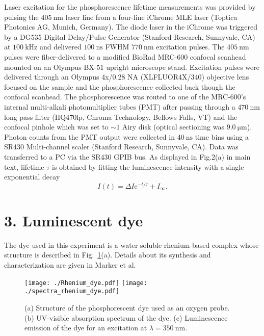 \documentclass[aps,prl,twocolumn,superscriptaddress,groupedaddress]{revtex4}
\begin{document}
Laser excitation for the phosphorescence lifetime measurements was provided by pulsing the $\SI{405}{\nano\meter}$ laser line from a four-line iChrome MLE laser (Toptica Photonics AG, Munich, Germany). The diode laser in the iChrome was triggered by a DG535 Digital Delay/Pulse Generator (Stanford Research, Sunnyvale, CA) at $\SI{100}{\kilo\hertz}$ and delivered $\SI{100}{\nano\second}$ FWHM $\SI{770}{\nano\meter}$ excitation pulses. The $\SI{405}{\nano\meter}$ pulses were fiber-delivered to a modified BioRad MRC-600 confocal scanhead mounted on an Olympus BX-51 upright microscope stand. Excitation pulses were delivered through an Olympus 4x/0.28 NA (XLFLUOR4X/340) objective lens focused on the sample and the phosphorescence collected back though the confocal scanhead. The phosphorescence was routed to one of the MRC-600's internal multi-alkali  photomultiplier tubes (PMT) after passing through a $\SI{470}{\nano\meter}$ long pass filter (HQ470lp, Chroma Technology, Bellows Falls, VT) and the confocal pinhole which was set to $\sim 1$ Airy disk (optical sectioning was $\SI{9.0}{\micro\meter}$).  Photon counts from the PMT output were collected in $\SI{40}{\nano\second}$ time bins using a SR430 Multi-channel scaler (Stanford Research, Sunnyvale, CA). Data was transferred to a PC via the SR430 GPIB bus. As displayed in Fig.2(a) in main text, lifetime $\tau$ is obtained by fitting the luminescence intensity with a single exponential decay
\begin{equation}
I(t) = \Delta I \mathrm{e}^{-t/\tau} + I_\infty.
\label{eq:exponential_decay}
\end{equation}

\section*{3. Luminescent dye}

The dye used in this experiment is a water soluble rhenium-based complex whose structure is described in Fig.~\ref{fig:rhenium_dye}(a). Details about its synthesis and characterization are given in Marker et al.~\cite{marker_2018}

\onecolumngrid
\begin{center}
\begin{figure}[h]
\texttt{[image: ./Rhenium\_dye.pdf]}
\texttt{[image: ./spectra\_rhenium\_dye.pdf]}
\caption{(a) Structure of the phosphorescent dye used as an oxygen probe. (b) UV-visible absorption spectrum of the dye. (c) Luminescence emission of the dye for an excitation at $\lambda=\SI{350}{\nano\meter}$. \label{fig:rhenium_dye}}
\end{figure}
\end{center}
\twocolumngrid
\end{document}
